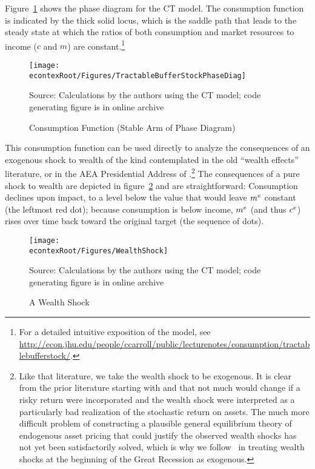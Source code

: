 \documentclass[titlepage]{\econtex}
\begin{document}
Figure~\ref{fig:PhaseDiag} shows the phase diagram for the CT model.
The consumption function is indicated by the thick solid locus, which is the
saddle path that leads to the steady state at which the ratios of
both consumption and market resources to income ($c$ and $m$) are constant.\footnote{For a detailed
intuitive exposition of the model, see \\
\url{http://econ.jhu.edu/people/ccarroll/public/lecturenotes/consumption/tractablebufferstock/}.}

\hypertarget{PhaseDiag}{}
\begin{figure}
\caption{Consumption Function (Stable Arm of Phase Diagram)}\label{fig:PhaseDiag}
\texttt{[image: \\econtexRoot/Figures/TractableBufferStockPhaseDiag]}

\tiny Source: Calculations by the authors using the CT  model; code generating figure is in online archive
\end{figure}

This consumption function can be used directly to analyze the consequences of an exogenous shock
to wealth of the kind contemplated in the old ``wealth effects'' literature, or in the AEA Presidential Address of \cite{hall:slump}.\footnote{Like that literature,
we take the wealth shock to be exogenous.  It is clear from the prior
literature starting with \cite{merton:restat} and \cite{samuelson:portfolio} that not much would change if a risky return were incorporated and the wealth shock were interpreted as a particularly bad realization
of the stochastic return on assets.  The much more difficult problem of constructing a plausible general equilibrium theory
of endogenous asset pricing that could justify the observed wealth shocks has not yet been satisfactorily solved, which is why we follow~\cite{hall:slump} in treating wealth shocks at the beginning of the Great Recession as exogenous.}  The consequences of a pure shock to wealth are depicted in figure~\ref{fig:WealthShock} and are straightforward: Consumption declines upon impact, to a level below the value that would leave $m^{e}$ constant (the leftmost red dot); because consumption is below income, $m^{e}$ (and thus $c^{e}$) rises over time back toward the original target (the sequence of dots).

\hypertarget{PhaseDiag}{}
\begin{figure}
\caption{A Wealth Shock}\label{fig:WealthShock}
\texttt{[image: \\econtexRoot/Figures/WealthShock]}

\tiny Source: Calculations by the authors using the CT  model; code generating figure is in online archive
\end{figure}
\end{document}
